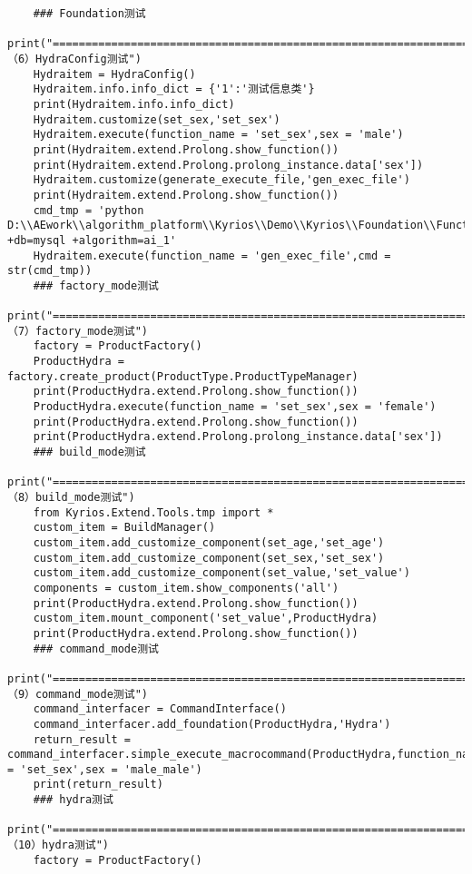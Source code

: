 \documentclass[cn,hazy,blue,14pt,screen]{elegantnote}
\begin{document}
\begin{lstlisting}
	### Foundation测试
	print("======================================================================== （6）HydraConfig测试")
	Hydraitem = HydraConfig()
	Hydraitem.info.info_dict = {'1':'测试信息类'}
	print(Hydraitem.info.info_dict)
	Hydraitem.customize(set_sex,'set_sex')
	Hydraitem.execute(function_name = 'set_sex',sex = 'male')
	print(Hydraitem.extend.Prolong.show_function())
	print(Hydraitem.extend.Prolong.prolong_instance.data['sex'])
	Hydraitem.customize(generate_execute_file,'gen_exec_file')
	print(Hydraitem.extend.Prolong.show_function())
	cmd_tmp = 'python D:\\AEwork\\algorithm_platform\\Kyrios\\Demo\\Kyrios\\Foundation\\Function\\hydra_main.py +db=mysql +algorithm=ai_1'
	Hydraitem.execute(function_name = 'gen_exec_file',cmd = str(cmd_tmp))
	### factory_mode测试
	print("======================================================================== （7）factory_mode测试")
	factory = ProductFactory()
	ProductHydra = factory.create_product(ProductType.ProductTypeManager)
	print(ProductHydra.extend.Prolong.show_function())
	ProductHydra.execute(function_name = 'set_sex',sex = 'female')
	print(ProductHydra.extend.Prolong.show_function())
	print(ProductHydra.extend.Prolong.prolong_instance.data['sex'])
	### build_mode测试
	print("======================================================================== （8）build_mode测试")
	from Kyrios.Extend.Tools.tmp import *
	custom_item = BuildManager()
	custom_item.add_customize_component(set_age,'set_age')
	custom_item.add_customize_component(set_sex,'set_sex')
	custom_item.add_customize_component(set_value,'set_value')
	components = custom_item.show_components('all')
	print(ProductHydra.extend.Prolong.show_function())
	custom_item.mount_component('set_value',ProductHydra)
	print(ProductHydra.extend.Prolong.show_function())
	### command_mode测试
	print("======================================================================== （9）command_mode测试")
	command_interfacer = CommandInterface()
	command_interfacer.add_foundation(ProductHydra,'Hydra')
	return_result = command_interfacer.simple_execute_macrocommand(ProductHydra,function_name = 'set_sex',sex = 'male_male')
	print(return_result)
	### hydra测试
	print("======================================================================== （10）hydra测试")
	factory = ProductFactory()

\end{lstlisting}
\end{document}
